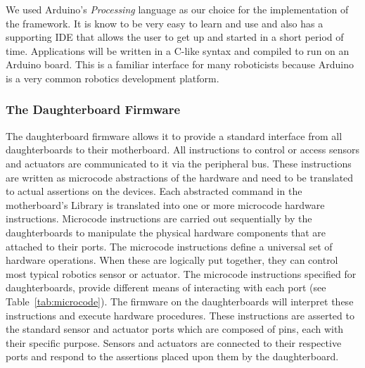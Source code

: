 	We used Arduino's \emph{Processing} language as our choice for the implementation of the framework. It is know to be very easy to learn and use and also has a supporting IDE that allows the user to get up and started in a short period of time. 
	Applications will be written in a C-like syntax and compiled to run on an Arduino board. This is a familiar interface for many roboticists because Arduino is a very common robotics development platform.
	
	\subsubsection{The Daughterboard Firmware} %
	\label{ssub:the_daughterboard_firmware}
	The daughterboard firmware allows it to provide a standard interface from all daughterboards to their motherboard. All instructions to control or access sensors and actuators are communicated to it via the peripheral bus. These instructions are written as microcode abstractions of the hardware and need to be translated to actual assertions on the devices. Each abstracted command in the motherboard's \xten Library is translated into one or more microcode hardware instructions. Microcode instructions are carried out sequentially by the daughterboards to manipulate the physical hardware components that are attached to their ports. The microcode instructions define a universal set of hardware operations. When these are logically put together, they can control most typical robotics sensor or actuator.
		The microcode instructions specified for daughterboards, provide different means of interacting with each port (see Table~\ref{tab:microcode}).
	The firmware on the daughterboards will interpret these instructions and execute hardware procedures. These instructions are asserted to the standard sensor and actuator ports which are composed of pins, each with their specific purpose. Sensors and actuators are connected to their respective ports and respond to the assertions placed upon them by the daughterboard.
	
